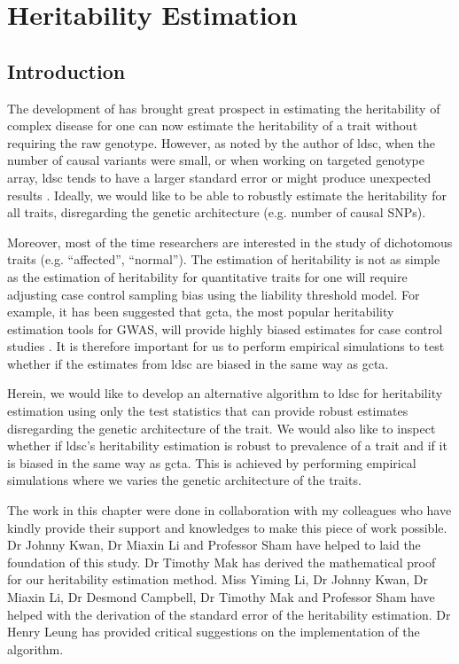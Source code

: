 \chapter{Heritability Estimation}

	\section{Introduction}
	The development of  has brought great prospect in estimating the heritability of complex disease for one can now estimate the heritability of a trait without requiring the raw genotype. 
	However, as noted by the author of \gls{ldsc}, when the number of causal variants were small, or when working on targeted genotype array, \gls{ldsc} tends to have a larger standard error or might produce unexpected results \citep{Bulik-Sullivan2015}.
	Ideally, we would like to be able to robustly estimate the heritability for all traits, disregarding the genetic architecture (e.g. number of causal \glspl{SNP}).
	
	Moreover, most of the time researchers are interested in the study of dichotomous traits (e.g. ``affected'', ``normal'').
	The estimation of heritability is not as simple as the estimation of heritability for quantitative traits for one will require adjusting case control sampling bias using the liability threshold model.
	For example, it has been suggested that \gls{gcta}, the most popular heritability estimation tools for \gls{GWAS}, will provide highly biased estimates for case control studies \citep{Golan2014}.
	It is therefore important for us to perform empirical simulations to test whether if the estimates from \gls{ldsc} are biased in the same way as \gls{gcta}.
	
	Herein, we would like to develop an alternative algorithm to \gls{ldsc} for heritability estimation using only the test statistics that can provide robust estimates disregarding the genetic architecture of the trait.
	We would also like to inspect whether if \gls{ldsc}'s heritability estimation is robust to prevalence of a trait and if it is biased in the same way as \gls{gcta}.
	This is achieved by performing empirical simulations where we varies the genetic architecture of the traits.
	
	The work in this chapter were done in collaboration with my colleagues who have kindly provide their support and knowledges to make this piece of work possible.
	Dr Johnny Kwan, Dr Miaxin Li and Professor Sham have helped to laid the foundation of this study. 
	Dr Timothy Mak has derived the mathematical proof for our heritability estimation method. 
	Miss Yiming Li, Dr Johnny Kwan, Dr Miaxin Li, Dr Desmond Campbell, Dr Timothy Mak and Professor Sham have helped with the derivation of the standard error of the heritability estimation. 
	Dr Henry Leung has provided critical suggestions on the implementation of the algorithm.
	
